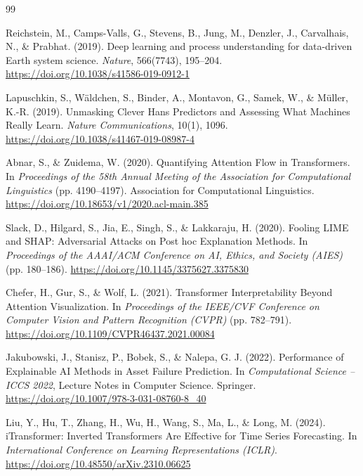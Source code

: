 
\begin{thebibliography}{99}

 Reichstein, M., Camps-Valls, G., Stevens, B., Jung, M., Denzler, J., Carvalhais, N., \& Prabhat. (2019). Deep learning and process understanding for data-driven Earth system science. \emph{Nature}, 566(7743), 195--204. \url{https://doi.org/10.1038/s41586-019-0912-1}

 Lapuschkin, S., W\"aldchen, S., Binder, A., Montavon, G., Samek, W., \& M\"uller, K.-R. (2019). Unmasking Clever Hans Predictors and Assessing What Machines Really Learn. \emph{Nature Communications}, 10(1), 1096. \url{https://doi.org/10.1038/s41467-019-08987-4}

 Abnar, S., \& Zuidema, W. (2020). Quantifying Attention Flow in Transformers. In \emph{Proceedings of the 58th Annual Meeting of the Association for Computational Linguistics} (pp. 4190--4197). Association for Computational Linguistics. \url{https://doi.org/10.18653/v1/2020.acl-main.385}

 Slack, D., Hilgard, S., Jia, E., Singh, S., \& Lakkaraju, H. (2020). Fooling LIME and SHAP: Adversarial Attacks on Post hoc Explanation Methods. In \emph{Proceedings of the AAAI/ACM Conference on AI, Ethics, and Society (AIES)} (pp. 180--186). \url{https://doi.org/10.1145/3375627.3375830}

 Chefer, H., Gur, S., \& Wolf, L. (2021). Transformer Interpretability Beyond Attention Visualization. In \emph{Proceedings of the IEEE/CVF Conference on Computer Vision and Pattern Recognition (CVPR)} (pp. 782--791). \url{https://doi.org/10.1109/CVPR46437.2021.00084}

 Jakubowski, J., Stanisz, P., Bobek, S., \& Nalepa, G. J. (2022). Performance of Explainable AI Methods in Asset Failure Prediction. In \emph{Computational Science -- ICCS 2022}, Lecture Notes in Computer Science. Springer. \url{https://doi.org/10.1007/978-3-031-08760-8_40}

 Liu, Y., Hu, T., Zhang, H., Wu, H., Wang, S., Ma, L., \& Long, M. (2024). iTransformer: Inverted Transformers Are Effective for Time Series Forecasting. In \emph{International Conference on Learning Representations (ICLR)}. \url{https://doi.org/10.48550/arXiv.2310.06625}


\end{thebibliography}
